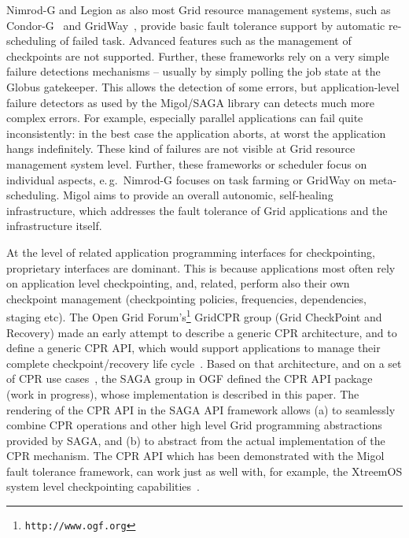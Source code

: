 \documentclass[times, 10pt,twocolumn]{article}
\begin{document}
Nimrod-G and Legion as also most Grid resource management systems,
such as Condor-G~\cite{citeulike:291860} and GridWay~\cite{Montero05},
provide basic fault tolerance support by automatic re-scheduling of
failed task. Advanced features such as the management of checkpoints
are not supported. Further, these frameworks rely on a very simple
failure detections mechanisms -- usually by simply polling the job
state at the Globus gatekeeper. This allows the detection of some
errors, but application-level failure detectors as used by the
Migol/SAGA library can detects much more complex errors. For example,
especially parallel applications can fail quite inconsistently: in the
best case the application aborts, at worst the application hangs
indefinitely. These kind of failures are not visible at Grid resource
management system level. Further, these frameworks or scheduler focus
on individual aspects, e.\,g.\ Nimrod-G focuses on task farming or
GridWay on meta-scheduling. Migol aims to provide an overall
autonomic, self-healing infrastructure, which addresses the fault
tolerance of Grid applications and the infrastructure itself.

At the level of related application programming interfaces for
checkpointing, proprietary interfaces are dominant. This is because
applications most often rely on application level checkpointing, and,
related, perform also their own checkpoint management (checkpointing
policies, frequencies, dependencies, staging etc).  The Open Grid
Forum's\footnote{\texttt{http://www.ogf.org}} GridCPR group (Grid
CheckPoint and Recovery) made an early attempt to describe a generic
CPR architecture, and to define a generic CPR API, which would support
applications to manage their complete checkpoint/recovery life
cycle~\cite{ogf_cpr_arch}.  Based on that architecture, and on a set
of CPR use cases~\cite{ogf_cpr_uc}, the SAGA group in OGF defined the
CPR API package~\cite{ogf_cpr_draft} (work in progress), whose
implementation is described in this paper.  The rendering of the CPR
API in the SAGA API framework allows (a) to seamlessly combine CPR
operations and other high level Grid programming abstractions provided
by SAGA, and (b) to abstract from the actual implementation of the CPR
mechanism.  The CPR API which has been demonstrated with the Migol
fault tolerance framework, can work just as well with, for example,
the XtreemOS system level checkpointing
capabilities~\cite{xtreemos_cpr}.

% 
\end{document}
